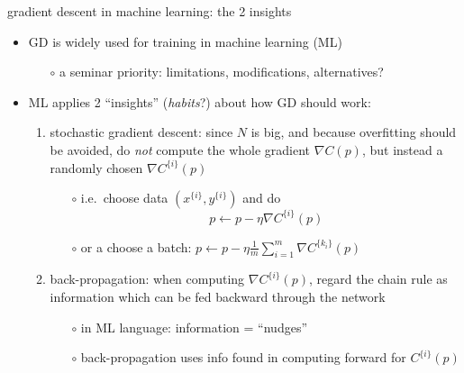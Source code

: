 \documentclass[xcolor={svgnames},
               hyperref={colorlinks,citecolor=DeepPink4,linkcolor=FireBrick,urlcolor=Maroon}]
               {beamer}
\newcommand{\grad}{\nabla}
\begin{document}
\begin{frame}{gradient descent in machine learning: the 2 insights}

\begin{itemize}
\item GD is widely used for training in \alert{machine learning} (ML)
    \begin{itemize}
    \item[$\circ$] a seminar priority: limitations, modifications, alternatives?
    \end{itemize}

\medskip
\item ML applies 2 ``insights'' (\emph{habits}?) about how GD should work:
    \begin{enumerate}

\bigskip
    \item \alert{stochastic gradient descent}: since $N$ is big, and because overfitting should be avoided, do \emph{not} compute the whole gradient $\grad C(p)$, but instead a randomly chosen $\grad C^{\{i\}}(p)$
        \begin{itemize}
        \item[$\circ$] i.e.~choose data $(x^{\{i\}},y^{\{i\}})$ and do
            $$p \gets p - \eta \grad C^{\{i\}}(p)$$
        \item[$\circ$] or a choose a \alert{batch}: $p \gets p - \eta \frac{1}{m} \sum_{i=1}^m \grad C^{\{k_i\}}(p)$
        \end{itemize}

\bigskip
    \item \alert{back-propagation}: when computing $\grad C^{\{i\}}(p)$, regard the chain rule as information which can be fed backward through the network
        \begin{itemize}
        \item[$\circ$] in ML language: information = ``nudges''
        \item[$\circ$] back-propagation uses info found in computing forward for $C^{\{i\}}(p)$
        \end{itemize}
    \end{enumerate}
\end{itemize}
\end{frame}
\end{document}
